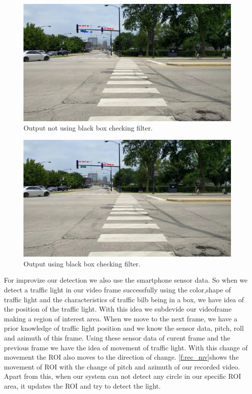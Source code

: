 \begin{figure}
\centering
\includegraphics[width=5.2in]{plots/norec_filter.jpg}
\caption{Output not using black box checking filter.}
\label{f:norec_filter}
\end{figure}

\begin{figure}
\centering
\includegraphics[width=5.2in]{plots/rec_filter.jpg}
\caption{Output using black box checking filter.}
\label{f:rec_filter}
\end{figure}

For improvize our detection we also use the smartphone sensor data.
So when we detect a traffic light in our video frame successfully using the color,shape of traffic light and the characteristics of traffic bilb being in a box, we have idea of the position of the traffic light.
With this idea we subdevide our videoframe making a region of interest area.
When we move to the next frame, we have a prior knowledge of traffic light position and we know the sensor data, pitch, roll and azimuth of this frame.
Using these sensor data of curent frame and the previous frame we have the idea of movement of traffic light.
With this change of movement the ROI also moves to the direction of change.
\ref{f:rec_mv}shows the movement of ROI with the change of pitch and azimuth of our recorded video.
Apart from this, when our system can not detect any circle in our specific ROI area, it updates the ROI and try to detect the light.

